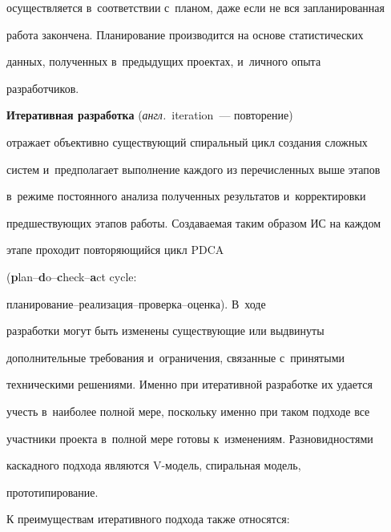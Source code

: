 осуществляется в~соответствии с~планом, даже если не вся запланированная 


работа закончена. Планирование производится на основе статистических 


данных, полученных в~предыдущих проектах, и~личного опыта 


разработчиков.


     


     \textbf{Итеративная разработка} (\textit{англ.}\ iteration~--- повторение) 


отражает объективно существующий спиральный цикл создания сложных 


систем и~предполагает выполнение каждого из перечисленных выше этапов 


в~режиме постоянного анализа полученных результатов и~корректировки 


предшествующих этапов работы. Создаваемая таким образом ИС на каждом 


этапе проходит повторяющийся цикл PDCA  


(\textbf{p}lan--\textbf{d}o--\textbf{c}heck--\textbf{a}ct cycle:  


пла\-ни\-ро\-ва\-ние--ре\-а\-ли\-за\-ция--про\-вер\-ка--оцен\-ка). В~ходе 


разработки могут быть изменены существующие или выдвинуты 


дополнительные требования и~ограничения, связанные с~принятыми 


техническими решениями. Именно при итеративной разработке их удается 


учесть в~наиболее полной мере, поскольку именно при таком подходе все 


участники проекта в~полной мере готовы к~изменениям. Разновидностями 


каскадного подхода являются V-мо\-дель, спиральная модель, 


прототипирование.


     


     К преимуществам итеративного подхода также относятся:



